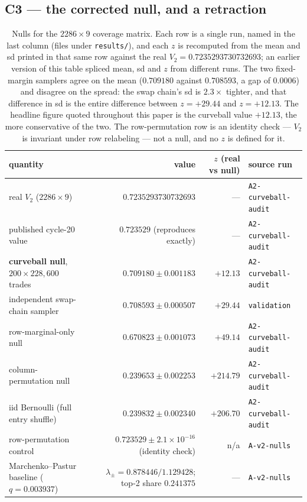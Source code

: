 \documentclass[11pt,a4paper]{article}
\theoremstyle{plain}
\theoremstyle{remark}
\theoremstyle{plain}
\begin{document}
\subsection{C3 --- the corrected null, and a retraction}
\label{sec:retraction}

\begin{table}[h]
\centering
\small
\begin{tabular}{lrrl}
\toprule
quantity & value & $z$ (real vs null) & source run \\
\midrule
real $V_2$ ($2286\times9$) & $0.7235293730732693$ & --- & \texttt{A2-curveball-audit} \\
published cycle-20 value & $0.723529$ (reproduces exactly) & --- & \texttt{A2-curveball-audit} \\
\textbf{curveball null}, $200\times228{,}600$ trades & $\mathbf{0.709180\pm0.001183}$ & $\mathbf{+12.13}$ & \texttt{A2-curveball-audit} \\
independent swap-chain sampler & $0.708593\pm0.000507$ & $+29.44$ & \texttt{validation} \\
row-marginal-only null & $0.670823\pm0.001073$ & $+49.14$ & \texttt{A2-curveball-audit} \\
column-permutation null & $0.239653\pm0.002253$ & $+214.79$ & \texttt{A2-curveball-audit} \\
iid Bernoulli (full entry shuffle) & $0.239832\pm0.002340$ & $+206.70$ & \texttt{A2-curveball-audit} \\
row-permutation control & $0.723529\pm2.1\times10^{-16}$ (identity check) & n/a & \texttt{A-v2-nulls} \\
Marchenko--Pastur baseline ($q=0.003937$) & $\lambda_\pm=0.878446/1.129428$; top-2 share $0.241375$ & --- & \texttt{A-v2-nulls} \\
\bottomrule
\end{tabular}
\caption{Nulls for the $2286\times9$ coverage matrix. Each row is a single run, named in the last column (files under \texttt{results/}), and each $z$ is recomputed from the mean and sd printed in that same row against the real $V_2=0.7235293730732693$; an earlier version of this table spliced mean, sd and $z$ from different runs. The two fixed-margin samplers agree on the mean ($0.709180$ against $0.708593$, a gap of $0.0006$) and disagree on the spread: the swap chain's sd is $2.3\times$ tighter, and that difference in sd is the entire difference between $z=+29.44$ and $z=+12.13$. The headline figure quoted throughout this paper is the curveball value $+12.13$, the more conservative of the two. The row-permutation row is an identity check --- $V_2$ is invariant under row relabeling --- not a null, and no $z$ is defined for it.}
\label{tab:nulls}
\end{table}
\end{document}
